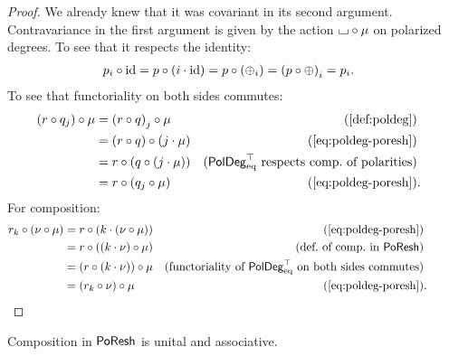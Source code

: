 \documentclass[a4paper]{memoir}
\begin{document}
\begin{proof}
	We already knew that it was covariant in its second argument.
	Contravariance in the first argument is given by the action ${\llcorner\hspace{-.4ex}\lrcorner} \circ \mu$ on polarized degrees.
	To see that it respects the identity:
	\begin{align*}
		{p}_{i} \circ \mathrm{id}
		&= p \circ (i \cdot \mathrm{id})
		= p \circ ({{\oplus}}_{i})
		= {(p \circ {\oplus})}_{i}
		= {p}_{i}.
	\end{align*}
	To see that functoriality on both sides commutes:
	\begin{align*}
		(r \circ \pdeg q j) \circ \mu
		&= \pdeg{(r \circ q)}{j} \circ \mu 
		& \text{(\cref{def:poldeg})} \\
		&= (r \circ q) \circ (j \cdot \mu)
		& \text{(\cref{eq:poldeg-poresh})} \\
		&= r \circ (q \circ (j \cdot \mu))
		& \text{($\poldegeqtop$ respects comp.\ of polarities)} \\
		&= r \circ (\pdeg q j \circ \mu)
		& \text{(\cref{eq:poldeg-poresh})}&.
	\end{align*}
	For composition:
	\begin{align*}
		\pdeg r k \circ (\nu \circ \mu)
		&= r \circ (k \cdot (\nu \circ \mu)) 
		& \text{(\cref{eq:poldeg-poresh})} \\
		&= r \circ ((k \cdot \nu) \circ \mu)
		& \text{(def.\ of comp.\ in $\poreshcat$)} \\
		&= (r \circ (k \cdot \nu)) \circ \mu 
		& \text{(functoriality of $\poldegeqtop$ on both sides commutes)} \\
		&= (\pdeg r k \circ \nu) \circ \mu
		& \text{(\cref{eq:poldeg-poresh})}&.
		& \qquad \qedhere
	\end{align*}
\end{proof}
\begin{proposition}
	Composition in $\mathsf{PoResh}$ is unital and associative.
\end{proposition}
\end{document}
